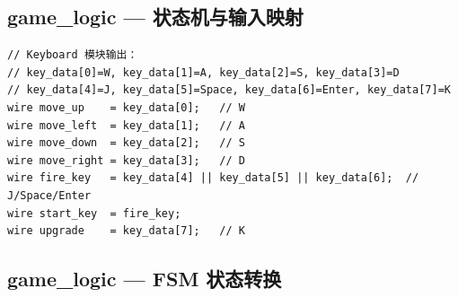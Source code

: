 \documentclass[12pt,a4paper]{ctexart}
\begin{document}
\subsection{game\_logic --- 状态机与输入映射}

\begin{lstlisting}
// Keyboard 模块输出：
// key_data[0]=W, key_data[1]=A, key_data[2]=S, key_data[3]=D
// key_data[4]=J, key_data[5]=Space, key_data[6]=Enter, key_data[7]=K
wire move_up    = key_data[0];   // W
wire move_left  = key_data[1];   // A
wire move_down  = key_data[2];   // S
wire move_right = key_data[3];   // D
wire fire_key   = key_data[4] || key_data[5] || key_data[6];  // J/Space/Enter
wire start_key  = fire_key;
wire upgrade    = key_data[7];   // K
\end{lstlisting}

\subsection{game\_logic --- FSM 状态转换}
\end{document}
